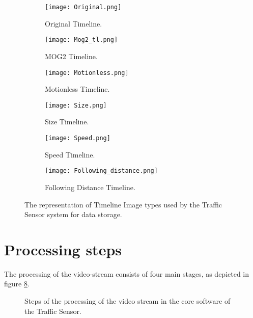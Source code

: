 \begin{figure}[!h]
	\centering
	\begin{subfigure}[!h]{0.9\textwidth}
		\texttt{[image: Original.png]}
		\caption{Original Timeline.\label{fig:original_timeline}}
	\end{subfigure}
	\hfill
	\begin{subfigure}[!h]{0.9\textwidth}
		\texttt{[image: Mog2\_tl.png]}
		\caption{MOG2 Timeline.\label{fig:mog2_timeline}}
	\end{subfigure}
	\hfill
	\begin{subfigure}[!h]{0.9\textwidth}
		\texttt{[image: Motionless.png]}
		\caption{Motionless Timeline. \label{fig:motionless_timeline}}
	\end{subfigure}
	\hfill
	\begin{subfigure}[!h]{0.9\textwidth}
		\texttt{[image: Size.png]}
		\caption{Size Timeline. \label{fig:size_timeline}}
	\end{subfigure}
	\hfill
	\begin{subfigure}[!h]{0.9\textwidth}
		\texttt{[image: Speed.png]}
		\caption{Speed Timeline. \label{fig:speed_timeline}}
	\end{subfigure}
	\hfill
	\begin{subfigure}[!h]{0.9\textwidth}
		\texttt{[image: Following\_distance.png]}
		\caption{Following Distance Timeline. \label{fig:fd_timeline}}
	\end{subfigure}
	\caption{The representation of Timeline Image types used by the Traffic Sensor system for data storage.\label{fig:timeline_types}}
\end{figure}

\section{Processing steps}
The processing of the video-stream consists of four main stages, as depicted in figure \ref{fig:processing_steps}.

\begin{figure}[p]
	\centering
	
	\caption{Steps of the processing of the video stream in the core software of the Traffic Sensor.\label{fig:processing_steps}}
\end{figure}

